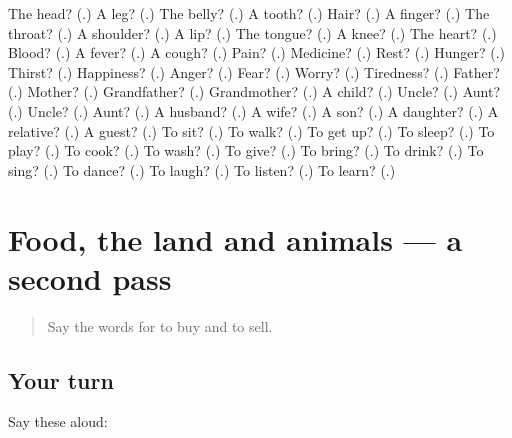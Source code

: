 \begin{tcolorbox}[breakable,colback=teal!4,colframe=teal!35!black,title={Before you move on}]
The head? (\textbf{}.) A leg? (\textbf{}.) The belly? (\textbf{}.) A tooth? (\textbf{}.) Hair? (\textbf{}.) A finger? (\textbf{}.) The throat? (\textbf{}.) A shoulder? (\textbf{}.) A lip? (\textbf{}.) The tongue? (\textbf{}.) A knee? (\textbf{}.) The heart? (\textbf{}.) Blood? (\textbf{}.) A fever? (\textbf{}.) A cough? (\textbf{}.) Pain? (\textbf{}.) Medicine? (\textbf{}.) Rest? (\textbf{}.) Hunger? (\textbf{}.) Thirst? (\textbf{}.) Happiness? (\textbf{}.) Anger? (\textbf{}.) Fear? (\textbf{}.) Worry? (\textbf{}.) Tiredness? (\textbf{}.) Father? (\textbf{}.) Mother? (\textbf{}.) Grandfather? (\textbf{}.) Grandmother? (\textbf{}.) A child? (\textbf{}.) Uncle? (\textbf{}.) Aunt? (\textbf{}.) Uncle? (\textbf{}.) Aunt? (\textbf{}.) A husband? (\textbf{}.) A wife? (\textbf{}.) A son? (\textbf{}.) A daughter? (\textbf{}.) A relative? (\textbf{}.) A guest? (\textbf{}.) To sit? (\textbf{}.) To walk? (\textbf{}.) To get up? (\textbf{}.) To sleep? (\textbf{}.) To play? (\textbf{}.) To cook? (\textbf{}.) To wash? (\textbf{}.) To give? (\textbf{}.) To bring? (\textbf{}.) To drink? (\textbf{}.) To sing? (\textbf{}.) To dance? (\textbf{}.) To laugh? (\textbf{}.) To listen? (\textbf{}.) To learn? (\textbf{}.)
\end{tcolorbox}
\section[(dialogue)]{Food, the land and animals — a second pass}

\label{lesson:GU-R68-second-pass-food-the-land-and-animals}



\begin{quote}
Say the words for to buy and to sell.
\end{quote}

\subsection*{Your turn}
Say these aloud:

